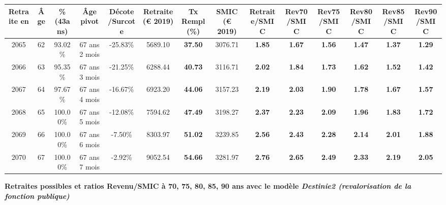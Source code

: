 \begin{adjustbox}{max width=\textwidth} 
\begin{tabular}[htb]{|c|c||c|c|c||c|c||c||c|c|c|c|c|c|} 
\hline 
 Retraite en &  Âge &  \%(43ans) &  Âge pivot &  Décote/Surcote &  Retraite (\euro{} 2019) &  Tx Rempl(\%) &  SMIC (\euro{} 2019) &  Retraite/SMIC &  Rev70/SMIC &  Rev75/SMIC &  Rev80/SMIC &  Rev85/SMIC &  Rev90/SMIC \\ 
\hline \hline 
 2065 &  62 &  93.02\% &  67 ans 2 mois &  -25.83\% &  5689.10 &  {\bf 37.50} &  3076.71 &  {\bf 1.85} &  {\bf 1.67} &  {\bf 1.56} &  {\bf 1.47} &  {\bf 1.37} &  {\bf 1.29} \\ 
\hline 
 2066 &  63 &  95.35\% &  67 ans 3 mois &  -21.25\% &  6288.44 &  {\bf 40.73} &  3116.71 &  {\bf 2.02} &  {\bf 1.84} &  {\bf 1.73} &  {\bf 1.62} &  {\bf 1.52} &  {\bf 1.42} \\ 
\hline 
 2067 &  64 &  97.67\% &  67 ans 4 mois &  -16.67\% &  6923.20 &  {\bf 44.06} &  3157.23 &  {\bf 2.19} &  {\bf 2.03} &  {\bf 1.90} &  {\bf 1.78} &  {\bf 1.67} &  {\bf 1.57} \\ 
\hline 
 2068 &  65 &  100.00\% &  67 ans 5 mois &  -12.08\% &  7594.62 &  {\bf 47.49} &  3198.27 &  {\bf 2.37} &  {\bf 2.23} &  {\bf 2.09} &  {\bf 1.96} &  {\bf 1.83} &  {\bf 1.72} \\ 
\hline 
 2069 &  66 &  100.00\% &  67 ans 6 mois &  -7.50\% &  8303.97 &  {\bf 51.02} &  3239.85 &  {\bf 2.56} &  {\bf 2.43} &  {\bf 2.28} &  {\bf 2.14} &  {\bf 2.01} &  {\bf 1.88} \\ 
\hline 
 2070 &  67 &  100.00\% &  67 ans 7 mois &  -2.92\% &  9052.54 &  {\bf 54.66} &  3281.97 &  {\bf 2.76} &  {\bf 2.65} &  {\bf 2.49} &  {\bf 2.33} &  {\bf 2.19} &  {\bf 2.05} \\ 
\hline 
\hline 
\end{tabular} 
\end{adjustbox} 
 
 \vspace{0.1cm} 
{\bf \noindent Retraites possibles et ratios Revenu/SMIC à 70, 75, 80, 85, 90 ans avec le modèle \emph{Destinie2 (revalorisation de la fonction publique)}}  
 
